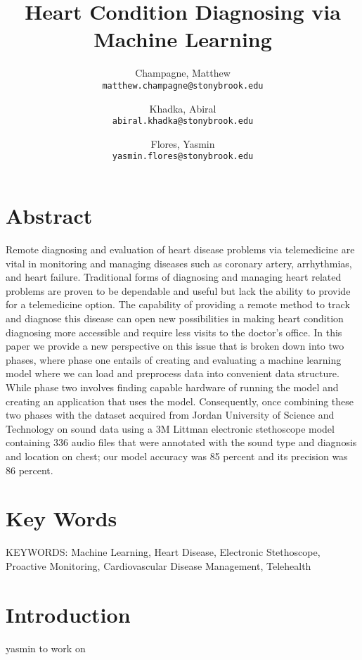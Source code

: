 \documentclass[twocolumn]{article}
\begin{document}
\title{Heart Condition Diagnosing via Machine Learning}
\author{
  Champagne, Matthew \\
  \texttt{matthew.champagne@stonybrook.edu}
  \and
  Khadka, Abiral \\
  \texttt{abiral.khadka@stonybrook.edu}
  \and
  Flores, Yasmin \\
  \texttt{yasmin.flores@stonybrook.edu}
}

\maketitle
\section{Abstract} 
Remote diagnosing and evaluation of heart disease problems via telemedicine are vital in monitoring and managing diseases such as coronary artery, arrhythmias, and heart failure. Traditional forms of diagnosing and managing heart related problems are proven to be dependable and useful but lack the ability to provide for a telemedicine option. The capability of providing a remote method to track and diagnose this disease can open new possibilities in making heart condition diagnosing more accessible and require less visits to the doctor’s office. In this paper we provide a new perspective on this issue that is broken down into two phases, where phase one entails of creating and evaluating a machine learning model where we can load and preprocess data into convenient data structure. While phase two involves finding capable hardware of running the model and creating an application that uses the model. Consequently, once combining these two phases with the dataset acquired from Jordan University of Science and Technology on sound data using a 3M Littman electronic stethoscope model containing 336 audio files that were annotated with the sound type and diagnosis and location on chest; our model accuracy was 85 percent and its precision was 86 percent. 

\section{Key Words} 
KEYWORDS: Machine Learning, Heart Disease, Electronic Stethoscope, Proactive Monitoring, Cardiovascular Disease Management, Telehealth 

\section{Introduction}
yasmin to work on 
\end{document}
